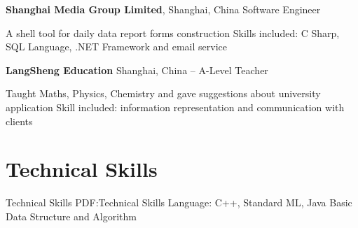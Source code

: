 \documentclass[letterpaper,10pt,oneside]{article}
\begin{document}
\begin{body}
\textbf{Shanghai Media Group Limited},
Shanghai, China
\hfill
{}
\GapNoBreak
\BulletItem
Software Engineer
\GapNoBreak
\begin{detail}
\SubBulletItem
A shell tool for daily data report forms construction
\SubBulletItem
Skills included: C Sharp, SQL Language, .NET Framework and email service
\end{detail}

\BigGap
\textbf{LangSheng Education}
Shanghai, China
\hfill
{} --
\GapNoBreak
\BulletItem
A-Level Teacher
\GapNoBreak
\begin{detail}
\SubBulletItem
Taught Maths, Physics, Chemistry and gave suggestions about university application
\SubBulletItem
Skill included: information representation and communication with clients
\end{detail}


\section
{Technical Skills}
{Technical Skills}
{PDF:Technical Skills}
\BulletItem Language: C++, Standard ML, Java
\BulletItem Basic Data Structure and Algorithm

%
%
%
%
%


%
%
%

\end{body}
\end{document}

